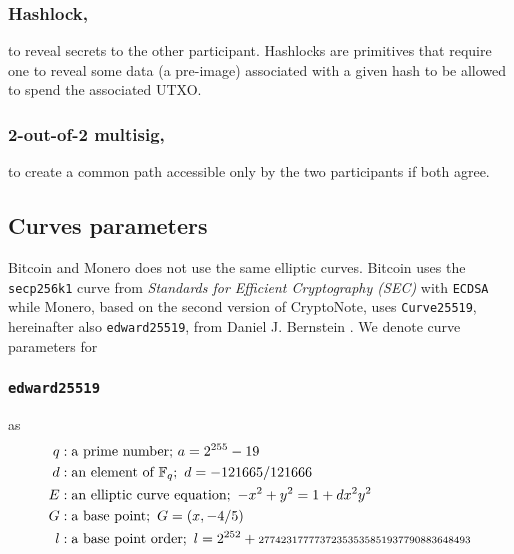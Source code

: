 \documentclass{llncs}
\begin{document}
\subsubsection{Hashlock,}
to reveal secrets to the other participant. Hashlocks are primitives that require one to reveal some data (a pre-image) associated with a given hash to be allowed to spend the associated UTXO.

\subsubsection{2-out-of-2 multisig,}
to create a common path accessible only by the two participants if both agree.

\subsection{Curves parameters}
\label{curveParams}
Bitcoin and Monero does not use the same elliptic curves. Bitcoin uses the \texttt{secp256k1} curve from \textit{Standards for Efficient Cryptography (SEC)} with \texttt{ECDSA} while Monero, based on the second version of CryptoNote, uses \texttt{Curve25519}, hereinafter also \texttt{edward25519}, from Daniel J. Bernstein \cite{CerRes10, van2013cryptonote}. We denote curve parameters for

\subsubsection{\texttt{edward25519}} as
\begin{equation}
\begin{split}
    q&: \text{a prime number;}\ a = 2^{255} - 19 \\
    d&: \text{an element of } \mathbb{F}_q;\ d = - 121665/121666 \\
    E&: \text{an elliptic curve equation};\ -x^2 + y^2 = 1 + dx^2y^2 \\
    G&: \text{a base point};\ G = (x, -4/5) \\
    l&: \text{a base point order};\ l = 2^{252} + \scriptsize\text{27742317777372353535851937790883648493} \\
\end{split}
\end{equation}
\end{document}
